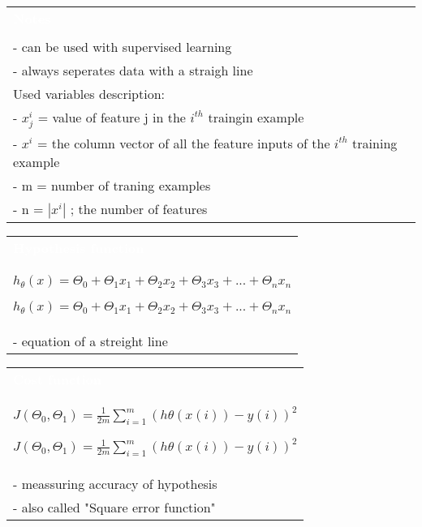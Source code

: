 \documentclass[a4paper,12pt,ngerman,fleqn]{article}
\newcommand{\mybox}[3]{
        \centering
        \begin{tabularx}{0.9\textwidth}{|X|}
            \rowcolor{accent}
            \rule{0pt}{20pt}
            \textcolor{white}{\textbf{#1}} \\
            \def\temp{#2}\ifx\temp\empty
                
            \else
                #2 \\ \hline
            \fi
            #3
            \\ \hline
        \end{tabularx}
    }
\begin{document}
    
    \setlength{\parindent}{0cm}


    \begin{minipage}[t]{.51\textwidth}
        \vspace{1pt}
        \mybox
            {Notes}
            {}
            {
                - can be used with supervised learning \\ 
                - always seperates data with a straigh line \\ \hline
                Used variables description: \\
                - \(x_{j}^i\) = value of feature j in the \(i^{th}\) traingin example \\
                - \(x^i\) = the column vector of all the feature inputs of the \(i^{th}\) training example \\
                - m = number of traning examples \\
                - n = \(|x^i|\) ; the number of features
            }
        \newline
        \newline
        \newline
        \mybox
            {Hypothesis function}
            {\( h_{\theta}(x) = \Theta_{0} + \Theta_{1}x_{1} + \Theta_{2}x_{2} + \Theta_{3}x_{3} + ... + \Theta_{n}x_{n} \)}
            {
                - equation of a streight line
            }
        \newline
        \newline
        \newline
        \mybox
            {Cost function}
            {\( J(\Theta_{0}, \Theta_{1}) = \frac{1}{2m} \sum\limits_{i=1}^{m} (h\theta(x{(i)}) - y{(i)})^2 \)}
            {
                - meassuring accuracy of hypothesis \\
                - also called "Square error function"
            }
        \newline
    \end{minipage}%
    \begin{minipage}[t]{.51\textwidth}
        \vspace{1pt}
        
    \end{minipage}
    
\end{document}
